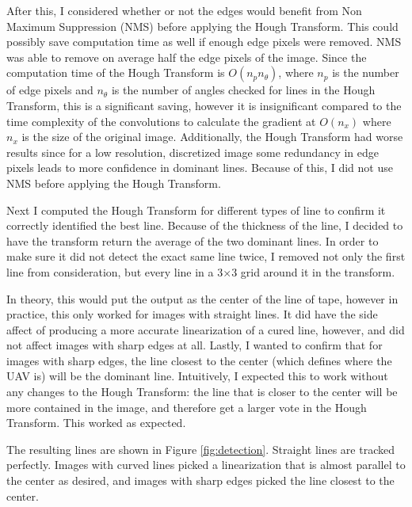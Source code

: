 \documentclass[10pt,twocolumn,letterpaper]{article}
\begin{document}
	After this, I considered whether or not the edges would benefit from Non Maximum Suppression (NMS) before applying the Hough Transform. This could possibly save computation time as well if enough edge pixels were removed. NMS was able to remove on average half the edge pixels of the image. Since the computation time of the Hough Transform is $O(n_p n_\theta)$, where $n_p$ is the number of edge pixels and $n_\theta$ is the number of angles checked for lines in the Hough Transform, this is a significant saving, however it is insignificant compared to the time complexity of the convolutions to calculate the gradient at $O(n_x)$ where $n_x$ is the size of the original image. Additionally, the Hough Transform had worse results since for a low resolution, discretized image some redundancy in edge pixels leads to more confidence in dominant lines. Because of this, I did not use NMS before applying the Hough Transform.
	
	Next I computed the Hough Transform for different types of line to confirm it correctly identified the best line. Because of the thickness of the line, I decided to have the transform return the average of the two dominant lines. In order to make sure it did not detect the exact same line twice, I removed not only the first line from consideration, but every line in a 3$\times$3 grid around it in the transform. 
	
	In theory, this would put the output as the center of the line of tape, however in practice, this only worked for images with straight lines. It did have the side affect of producing a more accurate linearization of a cured line, however, and did not affect images with sharp edges at all. Lastly, I wanted to confirm that for images with sharp edges, the line closest to the center (which defines where the UAV is) will be the dominant line. Intuitively, I expected this to work without any changes to the Hough Transform: the line that is closer to the center will be more contained in the image, and therefore get a larger vote in the Hough Transform. This worked as expected. 
	
	The resulting lines are shown in Figure \ref{fig:detection}. Straight lines are tracked perfectly. Images with curved lines picked a linearization that is almost parallel to the center as desired, and images with sharp edges picked the line closest to the center. 
\end{document}
